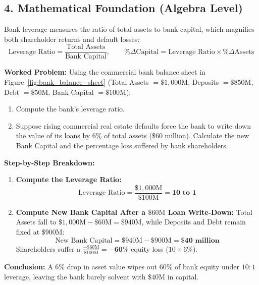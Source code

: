 \documentclass[11pt,letterpaper]{article}
\begin{document}
\subsection*{4. Mathematical Foundation (Algebra Level)}
Bank leverage measures the ratio of total assets to bank capital, which magnifies both shareholder returns and default losses:
\begin{equation}
\text{Leverage Ratio} = \frac{\text{Total Assets}}{\text{Bank Capital}}, \qquad \%\Delta \text{Capital} = \text{Leverage Ratio} \times \%\Delta \text{Assets}
\end{equation}

\noindent\textbf{Worked Problem:}
Using the commercial bank balance sheet in Figure~\ref{fig:bank_balance_sheet} (Total Assets $= \$1{,}000\text{M}$, Deposits $= \$850\text{M}$, Debt $= \$50\text{M}$, Bank Capital $= \$100\text{M}$):
\begin{enumerate}
    \item Compute the bank's leverage ratio.
    \item Suppose rising commercial real estate defaults force the bank to write down the value of its loans by $6\%$ of total assets ($\$60\text{ million}$). Calculate the new Bank Capital and the percentage loss suffered by bank shareholders.
\end{enumerate}

\noindent\textbf{Step-by-Step Breakdown:}
\begin{enumerate}
    \item \textbf{Compute the Leverage Ratio:}
    \[
    \text{Leverage Ratio} = \frac{\$1{,}000\text{M}}{\$100\text{M}} = \mathbf{10\text{ to }1}
    \]

    \item \textbf{Compute New Bank Capital After a $\$60\text{M}$ Loan Write-Down:}
    Total Assets fall to $\$1{,}000\text{M} - \$60\text{M} = \$940\text{M}$, while Deposits and Debt remain fixed at $\$900\text{M}$:
    \[
    \text{New Bank Capital} = \$940\text{M} - \$900\text{M} = \mathbf{\$40\text{ million}}
    \]
    Shareholders suffer a $\frac{-\$60\text{M}}{\$100\text{M}} = \mathbf{-60\%}$ equity loss ($10 \times 6\%$).
\end{enumerate}
\textbf{Conclusion:} A $6\%$ drop in asset value wipes out $60\%$ of bank equity under $10:1$ leverage, leaving the bank barely solvent with $\$40\text{M}$ in capital.

\end{document}
